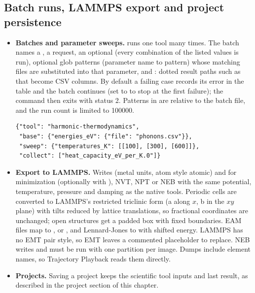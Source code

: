 \subsection{Batch runs, LAMMPS export and project persistence}\label{sec:automation-tools}
\begin{itemize}
\item \textbf{Batches and parameter sweeps.}  runs one tool many times. The batch names a , a  request, an optional  (every combination of the listed values is run), optional  glob patterns (parameter name to pattern) whose matching files are substituted into that parameter, and : dotted result paths such as  that become CSV columns. By default a failing case records its error in the table and the batch continues (set  to  to stop at the first failure); the command then exits with status 2. Patterns in  are relative to the batch file, and the run count is limited to 100000.
\begin{lstlisting}
{"tool": "harmonic-thermodynamics",
 "base": {"energies_eV": {"file": "phonons.csv"}},
 "sweep": {"temperatures_K": [[100], [300], [600]]},
 "collect": ["heat_capacity_eV_per_K.0"]}
\end{lstlisting}
\item \textbf{Export to LAMMPS.} Writes  (metal units, atom style atomic) and  for minimization (optionally with ), NVT, NPT or NEB with the same potential, temperature, pressure and damping as the native tools. Periodic cells are converted to LAMMPS's restricted triclinic form (a along $x$, b in the $xy$ plane) with tilts reduced by lattice translations, so fractional coordinates are unchanged; open structures get a padded box with fixed boundaries. EAM files map to ,  or , and Lennard-Jones to  with shifted energy. LAMMPS has no EMT pair style, so EMT leaves a commented placeholder to replace. NEB writes  and must be run with one partition per image. Dumps include element names, so Trajectory Playback reads them directly.
\item \textbf{Projects.} Saving a project keeps the scientific tool inputs and last result, as described in the project section of this chapter.
\end{itemize}

